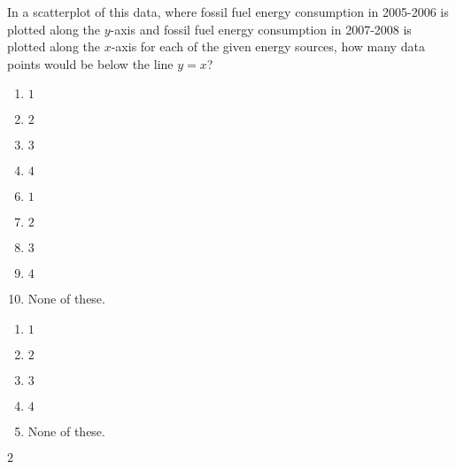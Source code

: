  
In a scatterplot of this data, where fossil fuel energy consumption in 2005-2006 is plotted along the $y$-axis and fossil fuel energy consumption in 2007-2008 is plotted along the $x$-axis for each of the given energy sources, how many data points would be below the line $y=x$?


\ifsat
	\begin{enumerate}[label=\Alph*)]
		\item $1 $ 
		\item $2 $ %
		\item $3 $ 
		\item $4 $
	\end{enumerate}
\else
\fi

\ifacteven
	\begin{enumerate}[label=\textbf{\Alph*.},itemsep=\fill,align=left]
		\setcounter{enumii}{5}
		\item $1 $ 
		\item $2 $ %
		\item $3 $ 
		\addtocounter{enumii}{1}
		\item $4 $
		\item None of these. 
	\end{enumerate}
\else
\fi

\ifactodd
	\begin{enumerate}[label=\textbf{\Alph*.},itemsep=\fill,align=left]
		\item $1 $ 
		\item $2 $ %
		\item $3 $ 
		\item $4 $
		\item None of these. 
	\end{enumerate}
\else
\fi

\ifgridin
 $2 $ %
		
\else
\fi

